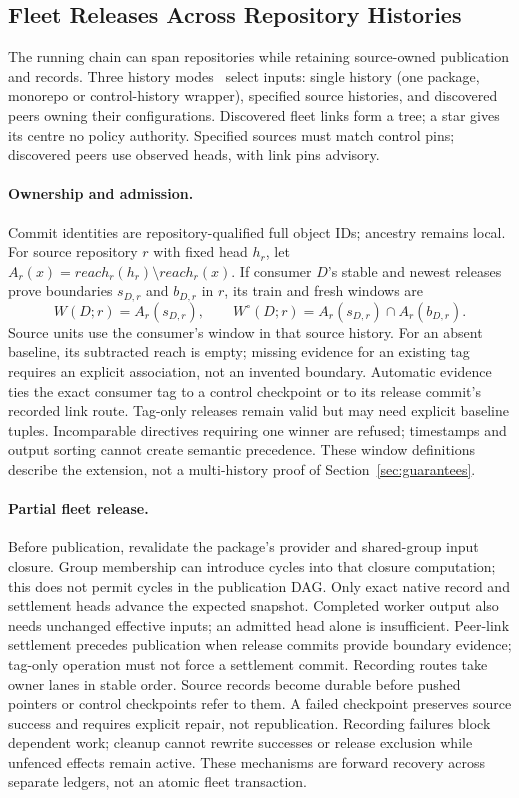 \subsection{Fleet Releases Across Repository Histories}
\label{sec:fleet}
The running chain can span repositories while retaining source-owned publication
and records. Three history modes~\cite{ccme2} select inputs: single history
(one package, monorepo or control-history wrapper), specified source histories,
and discovered peers owning their configurations. Discovered fleet links form
a tree; a star gives its centre no policy authority. Specified sources must
match control pins; discovered peers use observed heads, with link pins advisory.

\paragraph{Ownership and admission.}
Commit identities are repository-qualified full object IDs; ancestry remains
local. For source repository $r$ with fixed head $h_r$, let
$A_r(x)=\mathit{reach}_r(h_r)\setminus\mathit{reach}_r(x)$.
If consumer $D$'s stable and newest releases prove boundaries $s_{D,r}$ and
$b_{D,r}$ in $r$, its train and fresh windows are
\[
 W(D;r)=A_r(s_{D,r}),\qquad
 W^\circ(D;r)=A_r(s_{D,r})\cap A_r(b_{D,r}).
\]
Source units use the consumer's window in that source history. For an absent
baseline, its subtracted reach is empty; missing evidence for an existing tag requires
an explicit association, not an invented boundary. Automatic evidence ties the
exact consumer tag to a control checkpoint or to its release commit's recorded
link route. Tag-only releases remain valid but may need explicit baseline tuples.
Incomparable directives requiring one winner are refused; timestamps and output
sorting cannot create semantic precedence. These window definitions describe
the extension, not a multi-history proof of Section~\ref{sec:guarantees}.

\paragraph{Partial fleet release.}
Before publication, revalidate the package's provider and shared-group input
closure. Group membership can introduce cycles into that closure computation;
this does not permit cycles in the publication DAG. Only exact native record
and settlement heads advance the expected snapshot. Completed worker output
also needs unchanged effective inputs; an admitted head alone is insufficient.
Peer-link settlement precedes publication when release commits provide boundary
evidence; tag-only operation must not force a settlement commit. Recording
routes take owner lanes in stable order. Source records become durable before
pushed pointers or control checkpoints refer to them. A failed checkpoint
preserves source success and requires explicit repair, not republication.
Recording failures block dependent work; cleanup cannot rewrite successes or
release exclusion while unfenced effects remain active. These mechanisms are
forward recovery across separate ledgers, not an atomic fleet transaction.

